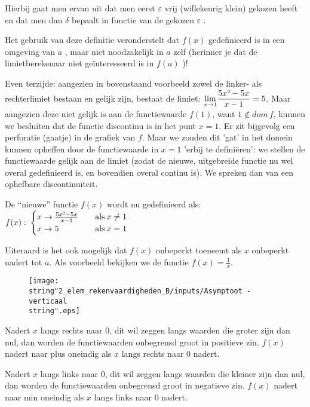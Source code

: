 Hierbij gaat men ervan uit dat men eerst $\varepsilon$ vrij (willekeurig
klein) gekozen heeft en dat men dan $\delta$ bepaalt in functie van
de gekozen $\varepsilon$ .

Het gebruik van deze definitie veronderstelt dat $f(x)$ gedefinieerd
is in een omgeving van $a$ , maar niet noodzakelijk in $a$ zelf
(herinner je dat de limietberekenaar niet ge\"interesseerd is in $f(a)$
)! 

\bigskip{}


\noindent Even terzijde: aangezien in bovenstaand voorbeeld zowel
de linker- als rechterlimiet bestaan en gelijk zijn, bestaat de limiet:
${\displaystyle \lim_{x\to1}}{\displaystyle \frac{5x\text{\texttwosuperior}-5x}{x-1}}=5$.
Maar aangezien deze niet gelijk is aan de functiewaarde $f(1)$, want
$1\notin dom\,f$, kunnen we besluiten dat de functie discontinu is
in het punt $x=1$. Er zit bijgevolg een perforatie (gaatje) in de
grafiek van $f$. Maar we zouden dit 'gat' in het domein kunnen opheffen
door de functiewaarde in $x=1$ 'erbij te defini\"eren': we stellen
de functiewaarde gelijk aan de limiet (zodat de nieuwe, uitgebreide
functie nu wel overal gedefinieerd is, en bovendien overal continu
is). We spreken dan van een ophefbare discontinu\"iteit.

\bigskip{}


\noindent De ``nieuwe'' functie $f(x)$ wordt nu gedefinieerd als:
$f(x):\:\begin{cases}
x\rightarrow\frac{5x\text{\texttwosuperior}-5x}{x-1} & \quad\mathrm{als}\:x\neq1\\
x\rightarrow5 & \quad\mathrm{als}\:x=1
\end{cases}$

\bigskip{}


\noindent Uiteraard is het ook mogelijk dat $f(x)$ onbeperkt toeneemt
als $x$ onbeperkt nadert tot $a$. Als voorbeeld bekijken we de functie
$f(x)=\frac{1}{x}$.

\begin{figure}[h]
\centering{}\texttt{[image: \\string"2\_elem\_rekenvaardigheden\_B/inputs/Asymptoot - verticaal\\string".eps]} 
\end{figure}

\noindent Nadert $x$ langs rechts naar $0$, dit wil zeggen langs
waarden die groter zijn dan nul, dan worden de functiewaarden onbegrensd
groot in positieve zin. $f(x)$ nadert naar plus oneindig als $x$
langs rechts naar $0$ nadert. 

\noindent Nadert $x$ langs links naar $0$, dit wil zeggen langs
waarden die kleiner zijn dan nul, dan worden de functiewaarden onbegrensd
groot in negatieve zin. $f(x)$ nadert naar min oneindig als $x$
langs links naar $0$ nadert.\medskip{}


